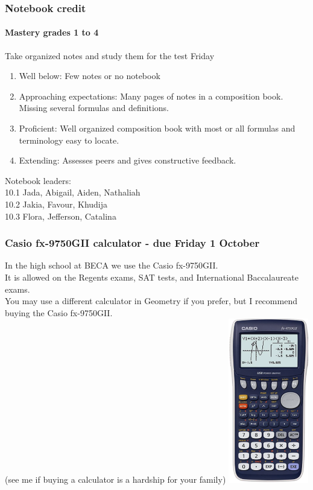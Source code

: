 \documentclass{beamer}
\begin{document}
\frame
{
  \frametitle{Notebook credit}
  \framesubtitle{Mastery grades 1 to 4}

  \begin{block}{Take organized notes and study them for the test Friday}
      \begin{enumerate}
        \item Well below: Few notes or no notebook
        \item Approaching expectations: Many pages of notes in a composition book. Missing several formulas and definitions.
        \item Proficient: Well organized composition book with most or all formulas and terminology easy to locate.
        \item Extending: Assesses peers and gives constructive feedback.
        \end{enumerate}\vspace{0.3cm}
        Notebook leaders: \\
        10.1 Jada, Abigail, Aiden, Nathaliah\\
        10.2 Jakia, Favour, Khudija\\
        10.3 Flora, Jefferson, Catalina

  \end{block}
}

  \frame
  {
    \frametitle{Casio fx-9750GII calculator - due Friday 1 October}
    \begin{multicols}{2}
    In the high school at BECA we use the Casio fx-9750GII.\\[5pt] 
    It is allowed on the Regents exams, SAT tests, and International Baccalaureate exams.\\[5pt]
    You may use a different calculator in Geometry if you prefer, but I recommend buying the Casio fx-9750GII.\\[5pt]
    (see me if buying a calculator is a hardship for your family)
    \includegraphics[width=3.5cm]{casio_fx-9750GII.png}
    \end{multicols}
  }
\end{document}

